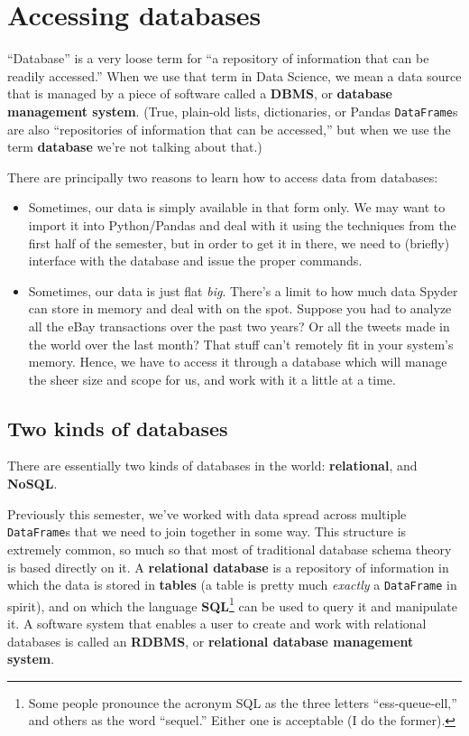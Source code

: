 \chapter{Accessing databases}


``Database'' is a very loose term for ``a repository of information that can
be readily accessed.'' When we use that term in Data Science, we mean a data
source that is managed by a piece of software called a \textbf{DBMS}, or
\textbf{database management system}. (True, plain-old lists, dictionaries, or
Pandas \texttt{DataFrame}s are also ``repositories of information that can be
accessed,'' but when we use the term \textbf{database} we're not talking about
that.)

There are principally two reasons to learn how to access data from databases:

\begin{itemize}
\itemsep.1em
\item Sometimes, our data is simply available in that form only. We may want
to import it into Python/Pandas and deal with it using the techniques from the
first half of the semester, but in order to get it in there, we need to
(briefly) interface with the database and issue the proper commands.
\item Sometimes, our data is just flat \textit{big}. There's a limit to how
much data Spyder can store in memory and deal with on the spot. Suppose
you had to analyze all the eBay transactions over the past two years? Or all
the tweets made in the world over the last month? That stuff can't remotely
fit in your system's memory. Hence, we have to access it through a database
which will manage the sheer size and scope for us, and work with it a little
at a time.
\end{itemize}

\section{Two kinds of databases}


There are essentially two kinds of databases in the world:
\textbf{relational}, and \textbf{NoSQL}.


Previously this semester, we've worked with data spread across multiple
\texttt{DataFrame}s that we need to join together in some way. This structure
is extremely common, so much so that most of traditional database schema theory
is based directly on it. A \textbf{relational database} is a repository of
information in which the data is stored in \textbf{tables} (a table is pretty
much \textit{exactly} a \texttt{DataFrame} in spirit), and on which the
language \textbf{SQL}\footnote{Some people pronounce the acronym SQL as the
three letters ``ess-queue-ell,'' and others as the word ``sequel.'' Either one
is acceptable (I do the former).} can be used to query it and manipulate it. A
software system that enables a user to create and work with relational
databases is called an \textbf{RDBMS}, or \textbf{relational database
management system}.

